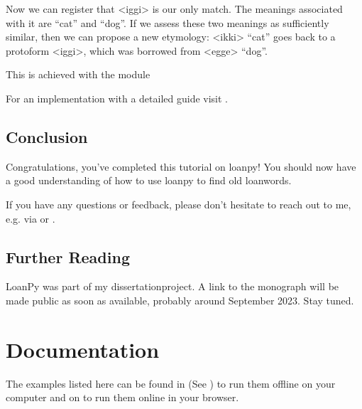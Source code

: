 \documentclass[letterpaper,10pt,english]{sphinxmanual}
\begin{document}
\sphinxAtStartPar
Now we can register that \textless{}iggi\textgreater{} is our only match. The meanings associated
with it are “cat” and “dog”. If we assess these two meanings as sufficiently
similar, then we can propose a new etymology: \textless{}ikki\textgreater{} “cat” goes back to
a proto\sphinxhyphen{}form \textless{}iggi\textgreater{}, which was borrowed from \textless{}egge\textgreater{} “dog”.

\sphinxAtStartPar
This is achieved with the 
module

\sphinxAtStartPar
For an implementation with a detailed guide visit
.


\section{Conclusion}
\label{\detokenize{tutorial:conclusion}}
\sphinxAtStartPar
Congratulations, you’ve completed this tutorial on loanpy! You should now
have a good understanding of how to use loanpy to find old loanwords.

\sphinxAtStartPar
If you have any questions or feedback, please don’t hesitate to reach out
to me, e.g. via  or
.


\section{Further Reading}
\label{\detokenize{tutorial:further-reading}}
\sphinxAtStartPar
LoanPy was part of my dissertation\sphinxhyphen{}project.
A link to the monograph will be made public as soon as available,
probably around September 2023. Stay tuned.

\sphinxstepscope


\chapter{Documentation}
\label{\detokenize{documentation:documentation}}\label{\detokenize{documentation::doc}}
\sphinxAtStartPar
The examples listed here can be found in
 (See
)
to run them offline on your computer and on
to run them online in your browser.
\end{document}
